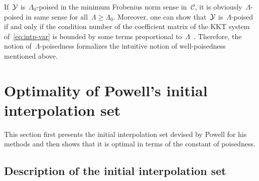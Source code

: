 \documentclass[draft]{article}
\numberwithin{equation}{section}
\theoremstyle{definition}
\theoremstyle{plain}
\theoremstyle{remark}
\newcommand*{\solvername}[1]{\textsc{#1}\xspace}
\newcommand*{\xpt}[1][]{\mathcal{Y}\ifblank{#1}{}{^{#1}}}
\begin{document}
If~$\xpt$ is~$\Lambda_0$-poised in the minimum Frobenius norm sense in~$\mathcal{C}$, it is obviously~$\Lambda$-poised in same sense for all~$\Lambda \ge \Lambda_0$.
Moreover, one can show that~$\xpt$ is~$\Lambda$-poised if and only if the condition number of the coefficient matrix of the KKT system of~\eqref{eq:intp-var} is bounded by some terms proportional to~$\Lambda$~\cite[Theorem~5.8]{Conn_Scheinberg_Vicente_2009}.
Therefore, the notion of~$\Lambda$-poisedness formalizes the intuitive notion of well-poisedness mentioned above.

\section{Optimality of Powell's initial interpolation set}
\label{sec:main-result}

This section first presents the initial interpolation set devised by Powell for his methods and then shows that it is optimal in terms of the constant of poisedness.

\subsection{Description of the initial interpolation set}
\label{subsec:powell-set}
\end{document}
